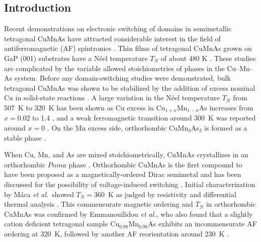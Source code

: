 \documentclass[10pt,doublespacing,edeposit]{uiucthesis2020}
\begin{document}
\begin{mainmatter}

\section{Introduction} 

Recent demonstrations on electronic switching of domains in  semimetallic tetragonal CuMnAs have attracted considerable interest in the field of antiferromagnetic (AF) spintronics \cite{Wadley2016,Grzybowski2017,Wadley2018,Matalla-Wagner2019}. Thin films of tetragonal CuMnAs grown on GaP (001) substrates have a N\'eel temperature $T_N$ of about 480 K \cite{Wadley2015,Hills2015}.
These studies are complicated by the variable allowed stoichiometries of  phases in the Cu--Mn--As system.
Before any domain-switching studies were demonstrated, bulk tetragonal CuMnAs was shown to be 
stabilized by the addition of excess nominal Cu in solid-state reactions \cite{Uhlirova2015}.
A large variation in the N\'{e}el temperature $T_N$ from 507~K to 320~K has been shown as Cu excess in Cu$_{1+x}$Mn$_{1-x}$As increases from $x = 0.02$ to 1.4 \cite{Uhlirova2019}, and a weak ferromagnetic transition around 300~K was reported around $x=0$ \cite{Nateprov2011}.
On the Mn excess side, orthorhombic CuMn$_3$As$_2$ is formed as a stable phase \cite{Uhlirova2015}.
 
When Cu, Mn, and As are mixed stoichiometrically, CuMnAs crystallizes in an orthorhombic $Pnma$ phase \cite{MacA2012}.
Orthorhombic CuMnAs is the first compound to have been proposed as a magnetically-ordered Dirac semimetal \cite{Tang2016} and has been discussed for the possibility of voltage-induced switching \cite{Kim2018}.
Initial characterization by M\'{a}ca \emph{et al.}\ showed $T_N = 360$~K as judged by resistivity and differential thermal analysis \cite{MacA2012}. This commensurate magnetic ordering and $T_N$ in orthorhombic CuMnAs was confirmed by Emmanouilidou \emph{et al.}, who also found that a slightly cation deficient tetragonal sample Cu$_{0.98}$Mn$_{0.96}$As exhibits an incommensurate AF ordering at 320~K, followed by another AF reorientation around 230~K \cite{emmanouilidou_magnetic_2017}.


\end{mainmatter}
\end{document}

